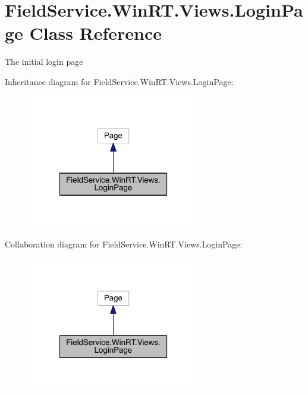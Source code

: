 \hypertarget{class_field_service_1_1_win_r_t_1_1_views_1_1_login_page}{\section{Field\+Service.\+Win\+R\+T.\+Views.\+Login\+Page Class Reference}
\label{class_field_service_1_1_win_r_t_1_1_views_1_1_login_page}
}


The initial login page  




Inheritance diagram for Field\+Service.\+Win\+R\+T.\+Views.\+Login\+Page\+:
\nopagebreak
\begin{figure}[H]
\begin{center}
\leavevmode
\includegraphics[width=214pt]{class_field_service_1_1_win_r_t_1_1_views_1_1_login_page__inherit__graph}
\end{center}
\end{figure}


Collaboration diagram for Field\+Service.\+Win\+R\+T.\+Views.\+Login\+Page\+:
\nopagebreak
\begin{figure}[H]
\begin{center}
\leavevmode
\includegraphics[width=214pt]{class_field_service_1_1_win_r_t_1_1_views_1_1_login_page__coll__graph}
\end{center}
\end{figure}
